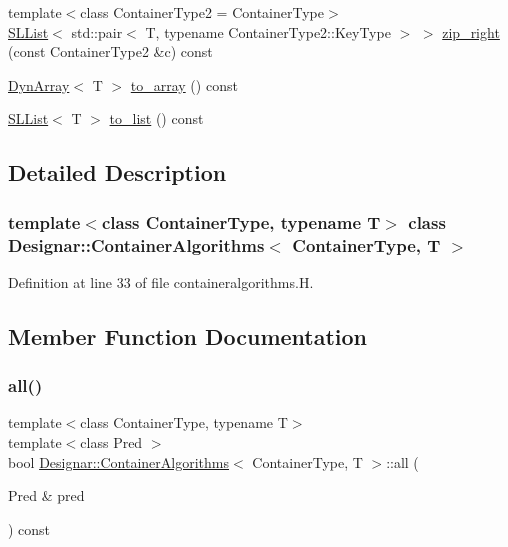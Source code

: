 \begin{DoxyCompactItemize}
\item 
{\footnotesize template$<$class Container\+Type2  = Container\+Type$>$ }\\\hyperlink{class_designar_1_1_s_l_list}{S\+L\+List}$<$ std\+::pair$<$ T, typename Container\+Type2\+::\+Key\+Type $>$ $>$ \hyperlink{class_designar_1_1_container_algorithms_aafb9d5320b99e9d39ed470b5b295f8b1}{zip\+\_\+right} (const Container\+Type2 \&c) const
\item 
\hyperlink{class_designar_1_1_dyn_array}{Dyn\+Array}$<$ T $>$ \hyperlink{class_designar_1_1_container_algorithms_a2a358d26ad630d1bb5995bff81f66bc4}{to\+\_\+array} () const
\item 
\hyperlink{class_designar_1_1_s_l_list}{S\+L\+List}$<$ T $>$ \hyperlink{class_designar_1_1_container_algorithms_a7800ec47f0b49c369f7341f72c70692a}{to\+\_\+list} () const
\end{DoxyCompactItemize}


\subsection{Detailed Description}
\subsubsection*{template$<$class Container\+Type, typename T$>$\newline
class Designar\+::\+Container\+Algorithms$<$ Container\+Type, T $>$}



Definition at line 33 of file containeralgorithms.\+H.



\subsection{Member Function Documentation}
\mbox{\label{class_designar_1_1_container_algorithms_a81f6c5f0fa93c2ef34cd8636f503bdf3}} 
\subsubsection{\texorpdfstring{all()}{all()}\hspace{0.1cm}{\footnotesize\ttfamily [1/2]}}
{\footnotesize\ttfamily template$<$class Container\+Type, typename T$>$ \\
template$<$class Pred $>$ \\
bool \hyperlink{class_designar_1_1_container_algorithms}{Designar\+::\+Container\+Algorithms}$<$ Container\+Type, T $>$\+::all (\begin{DoxyParamCaption}\item[{Pred \&}]{pred }\end{DoxyParamCaption}) const\hspace{0.3cm}{\ttfamily [inline]}}



